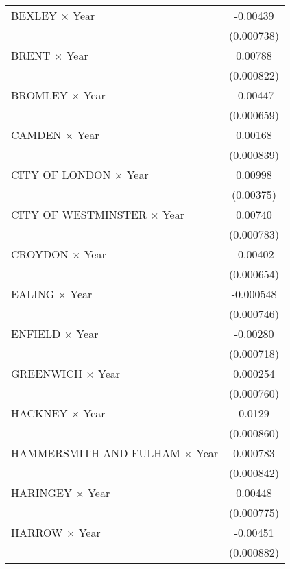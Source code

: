 {\begin{longtable}{l*{1}{c}}
\addlinespace
BEXLEY $\times$ Year&    -0.00439\sym{***}\\
                    &  (0.000738)         \\
\addlinespace
BRENT $\times$ Year &     0.00788\sym{***}\\
                    &  (0.000822)         \\
\addlinespace
BROMLEY $\times$ Year&    -0.00447\sym{***}\\
                    &  (0.000659)         \\
\addlinespace
CAMDEN $\times$ Year&     0.00168\sym{*}  \\
                    &  (0.000839)         \\
\addlinespace
CITY OF LONDON $\times$ Year&     0.00998\sym{**} \\
                    &   (0.00375)         \\
\addlinespace
CITY OF WESTMINSTER $\times$ Year&     0.00740\sym{***}\\
                    &  (0.000783)         \\
\addlinespace
CROYDON $\times$ Year&    -0.00402\sym{***}\\
                    &  (0.000654)         \\
\addlinespace
EALING $\times$ Year&   -0.000548         \\
                    &  (0.000746)         \\
\addlinespace
ENFIELD $\times$ Year&    -0.00280\sym{***}\\
                    &  (0.000718)         \\
\addlinespace
GREENWICH $\times$ Year&    0.000254         \\
                    &  (0.000760)         \\
\addlinespace
HACKNEY $\times$ Year&      0.0129\sym{***}\\
                    &  (0.000860)         \\
\addlinespace
HAMMERSMITH AND FULHAM $\times$ Year&    0.000783         \\
                    &  (0.000842)         \\
\addlinespace
HARINGEY $\times$ Year&     0.00448\sym{***}\\
                    &  (0.000775)         \\
\addlinespace
HARROW $\times$ Year&    -0.00451\sym{***}\\
                    &  (0.000882)         \\

\end{longtable}}
